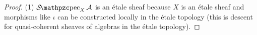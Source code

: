  \begin{proof}
   (1) $\Spec_X \A$ is an \'etale sheaf because $X$ is an \'etale sheaf and morphisms
   like $\iota$ can be constructed locally in the \'etale topology (this is
   descent for quasi-coherent sheaves of algebras in the \'etale topology).


\end{proof}
